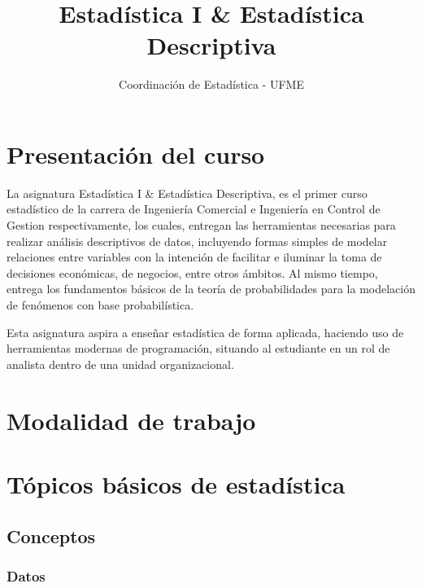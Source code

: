 \documentclass[
]{book}
\title{Estadística I \& Estadística Descriptiva}
\author{Coordinación de Estadística - UFME}
\date{}
\theoremstyle{definition}
\theoremstyle{definition}
\theoremstyle{definition}
\theoremstyle{definition}
\theoremstyle{remark}
\begin{document}
\maketitle

{
\setcounter{tocdepth}{1}
\tableofcontents
}
\hypertarget{presentaciuxf3n-del-curso}{%
\chapter*{Presentación del curso}\label{presentaciuxf3n-del-curso}}

La asignatura Estadística I \& Estadística Descriptiva, es el primer curso estadístico de la carrera de Ingeniería Comercial e Ingeniería en Control de Gestion respectivamente, los cuales, entregan las herramientas necesarias para realizar análisis descriptivos de datos, incluyendo formas simples de modelar relaciones entre variables con la intención de facilitar e iluminar la toma de decisiones económicas, de negocios, entre otros ámbitos. Al mismo tiempo, entrega los fundamentos básicos de la teoría de probabilidades para la modelación de fenómenos con base probabilística.

Esta asignatura aspira a enseñar estadística de forma aplicada, haciendo uso de herramientas modernas de programación, situando al estudiante en un rol de analista dentro de una unidad organizacional.

\hypertarget{modalidad-de-trabajo}{%
\chapter*{Modalidad de trabajo}\label{modalidad-de-trabajo}}

\hypertarget{tuxf3picos-buxe1sicos-de-estaduxedstica}{%
\chapter{Tópicos básicos de estadística}\label{tuxf3picos-buxe1sicos-de-estaduxedstica}}

\hypertarget{conceptos}{%
\section{Conceptos}\label{conceptos}}

\hypertarget{datos}{%
\subsection*{Datos}\label{datos}}
\end{document}
